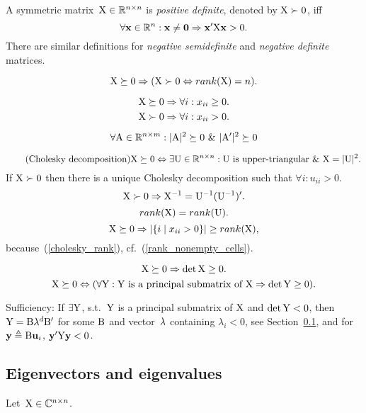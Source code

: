 \documentclass[10pt,a4paper]{article}
\theoremstyle{plain} \newtheorem{Lem}{Lemma}
\begin{document}
A symmetric matrix~$\mathrm X \in \mathbb R^{n \times n}$ is {\em positive     definite}, denoted by $\mathrm X \succ   0$, iff 
$$\forall \mathbf x \in \mathbb R^n: \mathbf x \ne \mathbf 0 \Rightarrow \mathbf x' \mathrm X \mathbf x > 0. $$
There are similar definitions for {\em negative semidefinite} and {\em negative definite} matrices.

$$ \mathrm X \succeq 0 \Rightarrow (\mathrm X \succ 0 \Leftrightarrow rank(\mathrm X) = n). $$

$$ \mathrm X \succeq 0 \Rightarrow \forall i : x_{ii} \ge 0. $$
$$ \mathrm X \succ 0 \Rightarrow \forall i : x_{ii} > 0. $$

$$ \forall \mathrm A \in \mathbb R^{n \times m}: |\mathrm A|^2 \succeq 0 \ \& \  |\mathrm A'|^2 \succeq 0 $$

\begin{equation} \tag{Cholesky decomposition}
\mathrm X \succeq 0 \Leftrightarrow \exists \mathrm U \in \mathbb R^{n \times n} : \mathrm U \text{ is upper-triangular} \ \& \  \mathrm X = |\mathrm U|^2.
\end{equation}
If $\mathrm X \succ 0$ then there is a unique Cholesky decomposition such that $\forall i : u_{ii} > 0$.
$$ \mathrm X \succ 0 \Rightarrow \mathrm X^{-1} = \mathrm U^{-1} (\mathrm U^{-1})'. $$
\begin{equation} \label{cholesky_rank}
rank(\mathrm X) = rank(\mathrm U).
\end{equation}
\begin{equation} \label{rank_nonempty_diagonal}
\mathrm X \succeq 0 \Rightarrow |\{i \mid x_{ii} > 0\}| \ge rank(\mathrm X), 
\end{equation}
because~(\ref{cholesky_rank}), cf.~(\ref{rank_nonempty_cells}).

$$ \mathrm X \succeq 0 \Rightarrow \det \mathrm X \ge 0. $$
$$ \mathrm X \succeq 0 \Leftrightarrow (\forall \mathrm Y : \text{$\mathrm Y$ is a principal submatrix of $\mathrm X$} \Rightarrow \det \mathrm Y \ge 0). $$
\proof
{
    Sufficiency: If $\exists \mathrm Y$, s.t.~$\mathrm Y$ is a principal submatrix of $\mathrm X$ and $\det \mathrm Y < 0$, 
    then $\mathrm Y = \mathrm B \mathbf \lambda^d \mathrm B'$ for some $\mathrm B$ and vector~$\mathbf \lambda$ containing $\lambda_i < 0$, see Section~\ref{eigen},
    and for $\mathbf y \triangleq \mathrm B \mathbf u_i$, $\mathbf y' \mathrm Y \mathbf y < 0$.
    
}



\subsection{Eigenvectors and eigenvalues} \label{eigen}

Let~$\mathrm X \in \mathbb C^{n \times n}$.
\end{document}
